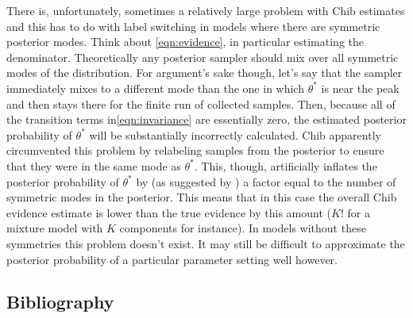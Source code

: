 \documentclass[11pt]{amsart}
\begin{document}
There is, unfortunately, sometimes a relatively large problem with Chib estimates and this has to do with label switching in models where there are symmetric posterior modes.  Think about \eqref{eqn:evidence}, in particular estimating the denominator.   Theoretically any posterior sampler should mix over all symmetric modes of the distribution.  For argument's sake though, let's say that the sampler immediately mixes to a different mode than the one in which $\theta^*$ is near the peak and then stays there for the finite run of collected samples.  Then, because all of the transition terms in\eqref{eqn:invariance} are essentially zero, the estimated posterior probability of $\theta^*$ will be substantially incorrectly calculated.  Chib apparently circumvented this problem by relabeling samples from the posterior to ensure that they were in the same mode as $\theta^*$.   This, though, artificially inflates the posterior probability of $\theta^*$ by (as suggested by \cite{neal_letter}) a factor equal to the number of symmetric modes in the posterior.  This means that in this case the overall Chib evidence estimate is lower than the true evidence by this amount ($K!$ for a mixture model with $K$ components for instance).  In models without these symmetries this problem doesn't exist.  It may still be difficult to approximate the posterior probability of a particular parameter setting well however.
\subsection{Bibliography}


\end{document}
